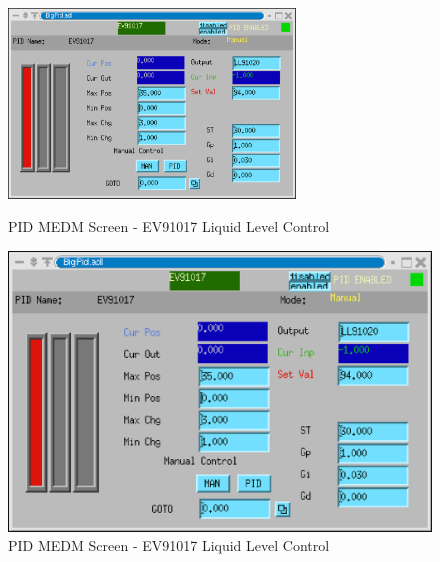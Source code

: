 \begin{figure}[h!]
\begin{latexonly}
\centering
\includegraphics[width=3in]{ev91017.eps}
\caption{PID MEDM Screen - EV91017 Liquid Level Control}
\label{fig:ev17llc}
\end{latexonly}
\begin{htmlonly}
\includegraphics{ev91017.eps}
\caption{PID MEDM Screen - EV91017 Liquid Level Control}
\label{fig:ev17llc}
\end{htmlonly}
\end{figure}


